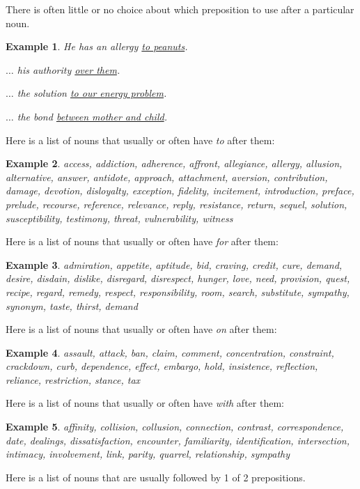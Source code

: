 \documentclass[oneside]{book}
\numberwithin{equation}{section}
\newtheorem{example}{Example}[section]
\begin{document}
There is often little or no choice about which preposition to use after a particular noun.
\begin{example}
    He has an allergy \underline{to peanuts}.
    
    $\ldots$ his authority \underline{over them}.
    
    $\ldots$ the solution \underline{to our energy problem}.
    
    $\ldots$ the bond \underline{between mother and child}.
\end{example}
%
\noindent{} Here is a list of nouns that usually or often have \textit{to} after them:
\begin{example}
    access, addiction, adherence, affront, allegiance, allergy, allusion, alternative, answer, antidote, approach, attachment, aversion, contribution, damage, devotion, disloyalty, exception, fidelity, incitement, introduction, preface, prelude, recourse, reference, relevance, reply, resistance, return, sequel, solution, susceptibility, testimony, threat, vulnerability, witness
\end{example}
Here is a list of nouns that usually or often have \textit{for} after them:
\begin{example}
    admiration, appetite, aptitude, bid, craving, credit, cure, demand, desire, disdain, dislike, disregard, disrespect, hunger, love, need, provision, quest, recipe, regard, remedy, respect, responsibility, room, search, substitute, sympathy, synonym, taste, thirst, demand
\end{example}
Here is a list of nouns that usually or often have \textit{on} after them:
\begin{example}
    assault, attack, ban, claim, comment, concentration, constraint, crackdown, curb, dependence, effect, embargo, hold, insistence, reflection, reliance, restriction, stance, tax
\end{example}
Here is a list of nouns that usually or often have \textit{with} after them:
\begin{example}
    affinity, collision, collusion, connection, contrast, correspondence, date, dealings, dissatisfaction, encounter, familiarity, identification, intersection, intimacy, involvement, link, parity, quarrel, relationship, sympathy
\end{example}
Here is a list of nouns that are usually followed by 1 of 2 prepositions.
\end{document}
